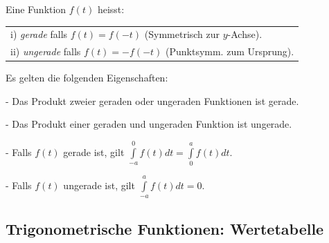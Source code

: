 \documentclass[a4paper, fontsize = 8pt, landscape]{scrartcl}
\begin{document}
\begin{multicols*}{3}
    Eine Funktion $f(t)$ heisst:

    \begin{center}
        \renewcommand{\arraystretch}{1.5}
        \begin{tabular}{l} \toprule
            i) \emph{gerade} falls $f(t) = f(-t)$ (Symmetrisch zur $y$-Achse).   \\
            ii) \emph{ungerade} falls $f(t) = -f(-t)$ (Punktsymm. zum Ursprung). \\
            \bottomrule
        \end{tabular}
    \end{center}

    Es gelten die folgenden Eigenschaften: \medskip

    - Das Produkt zweier geraden oder ungeraden Funktionen ist gerade.

    - Das Produkt einer geraden und ungeraden Funktion ist ungerade.

    - Falls $f(t)$ gerade ist, gilt $\int\limits_{-a}^{0} f(t) dt = \int\limits_{0}^{a} f(t) dt$.

    - Falls $f(t)$ ungerade ist, gilt $\int\limits_{-a}^{a} f(t) dt = 0$.




    \subsection{Trigonometrische Funktionen: Wertetabelle}


\end{multicols*}
\end{document}
